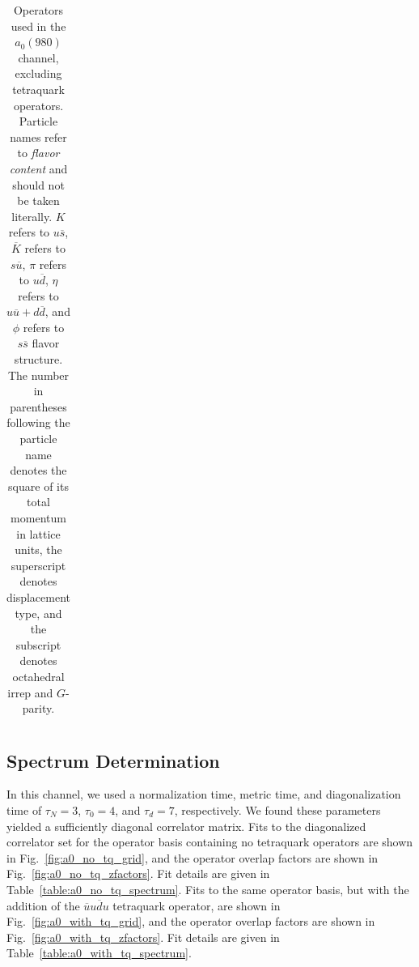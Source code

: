 \begin{table}
\begin{tabular}{l|l}
  \end{tabular}
  \caption[Operators used in the $a_0(980)$ channel, excluding tetraquark operators.]{Operators used in the $a_0(980)$ channel, excluding tetraquark operators. Particle names refer to \emph{flavor content} and should not be taken literally. $K$ refers to $u\overline s$, $\overline K$ refers to $s \overline u$, $\pi$ refers to $u\overline d$, $\eta$ refers to $u\overline u + d\overline d$, and $\phi$ refers to $s\overline s$ flavor structure. The number in parentheses following the particle name denotes the square of its total momentum in lattice units, the superscript denotes displacement type, and the subscript denotes octahedral irrep and $G$-parity.}
  \label{table:a0_ops_no_tq}
\end{table}
\subsection{Spectrum Determination}
In this channel, we used a normalization time, metric time, and diagonalization time of $\tau_N=3$, $\tau_0=4$, and $\tau_d=7$, respectively. We found these parameters yielded a sufficiently diagonal correlator matrix. Fits to the diagonalized correlator set for the operator basis containing no tetraquark operators are shown in Fig.~\ref{fig:a0_no_tq_grid}, and the operator overlap factors are shown in Fig.~\ref{fig:a0_no_tq_zfactors}. Fit details are given in Table~\ref{table:a0_no_tq_spectrum}. Fits to the same operator basis, but with the addition of the $\overline u u \overline d u$ tetraquark operator, are shown in Fig.~\ref{fig:a0_with_tq_grid}, and the operator overlap factors are shown in Fig.~\ref{fig:a0_with_tq_zfactors}. Fit details are given in Table~\ref{table:a0_with_tq_spectrum}.

